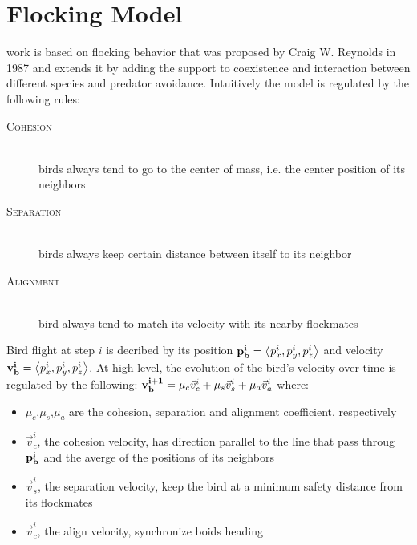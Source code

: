 \documentclass[journal,transmag]{IEEEtran}
\begin{document}


\section{Flocking Model}\label{sec:model}
 work is  based on flocking behavior that was proposed by
Craig W. Reynolds in 1987 and extends it by adding the support to coexistence
and interaction between different species and predator avoidance.
Intuitively the model is regulated by the following rules:
\begin{description}
\item[\textsc{Cohesion}] \hfill\\
	birds always tend to go to the center of mass, i.e.
the center position of its neighbors
\item[\textsc{Separation}] \hfill\\
	birds always keep certain distance between itself to its neighbor
\item[\textsc{Alignment}] \hfill\\
	bird always tend to match its velocity with its nearby flockmates
\end{description}

Bird flight at step $i$ is decribed by its position
$\vb{p^i_b}=\expval{p^i_x,p^i_y,p^i_z}$ and velocity
$\vb{v^i_b}=\expval{p^i_x,p^i_y,p^i_z}$. 
At high level, the evolution of the bird's  velocity over time is regulated by
the following: $\vb{v^{i+1}_b}=\mu_c \vec{v}^i_c + \mu_s \vec{v}^i_s +\mu_a
\vec{v}^i_a$ where:

\begin{itemize}
  \item $\mu_c$,$\mu_s$,$\mu_a$ are the cohesion, separation and alignment
  coefficient, respectively
  \item $\vec{v}^i_c$, the cohesion velocity, has direction parallel to the line
  that pass throug $\vb{p^i_b}$ and the averge of the positions of its neighbors
  \item $\vec{v}^i_s$, the separation velocity, keep the bird at a minimum
  safety distance from its flockmates
  \item  $\vec{v}^i_c$, the align velocity, synchronize boids heading
\end{itemize}
\end{document}
